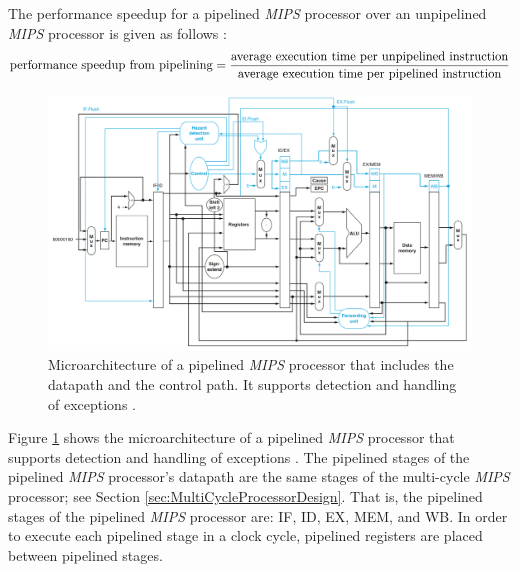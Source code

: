 The performance speedup for a pipelined {\it MIPS} processor over an unpipelined {\it MIPS} processor is given as follows \cite{Hennessy2012}:\begin{equation}
\label{eqn:pipelinedprocessorspeedup}
{\rm performance\ speedup\ from\ pipelining} = \frac{\rm average\ execution\ time\ per\ unpipelined\ instruction}{\rm average\ execution\ time\ per\ pipelined\ instruction}
\end{equation}


\begin{figure}[h]
\centering 
\includegraphics[width=6in]{./pics/pipelined-processor}
\caption{Microarchitecture of a pipelined {\it MIPS} processor that includes the datapath and the control path. It supports detection and handling of exceptions \cite{Patterson2012}.}
\label{fig:pipelinedprocessor}
\end{figure}

Figure \ref{fig:pipelinedprocessor} shows the microarchitecture of a pipelined {\it MIPS} processor that supports detection and handling of exceptions \cite{Patterson2012}. The pipelined stages of the pipelined {\it MIPS} processor's datapath are the same stages of the multi-cycle {\it MIPS} processor; see Section \ref{sec:MultiCycleProcessorDesign}. That is, the pipelined stages of the pipelined {\it MIPS} processor are: IF, ID, EX, MEM, and WB. In order to execute each pipelined stage in a clock cycle, pipelined registers are placed between pipelined stages. \\

